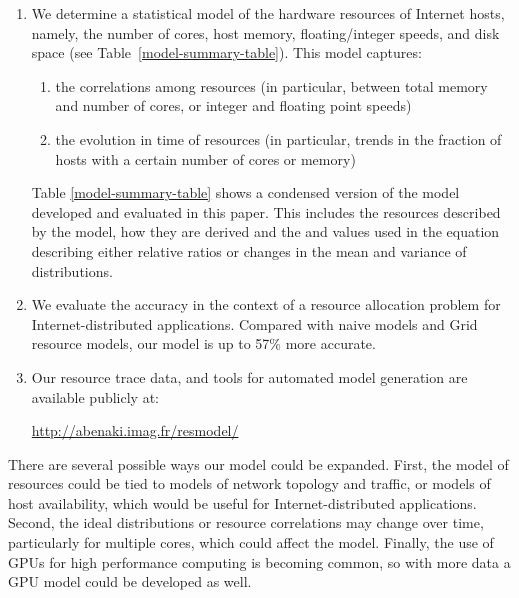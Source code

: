 \documentclass[conference]{IEEEtran}
\begin{document}
\begin{enumerate}
\item We determine a statistical model of the hardware
  resources of Internet hosts, namely, the number of cores,
  host memory, floating/integer speeds, and disk space (see
  Table~\ref{model-summary-table}).  This model captures:
 
  \begin{enumerate}
  \item the correlations among resources (in particular,
    between total memory and number of cores, or integer and
    floating point speeds)
  \item the evolution in time of resources (in particular,
    trends in the fraction of hosts with a certain number of
    cores or memory)
  \end{enumerate}
  
  Table \ref{model-summary-table} shows a condensed version
  of the model developed and evaluated in this paper.  This
  includes the resources described by the model, how they
  are derived and the  and  values used in the
  equation  describing either relative
  ratios or changes in the mean and variance of
  distributions.

\item We evaluate the accuracy in the
  context of a resource allocation problem for Internet-distributed applications.  Compared with naive models and
  Grid resource models, our model is up to 57\% more
  accurate.

\item Our resource trace data, and tools for automated model
  generation are available publicly at:
  
   \url{http://abenaki.imag.fr/resmodel/}
\end{enumerate}



There are several possible ways our model could be expanded.
First, the model of resources could be tied to models of
network topology and traffic, or models of host
availability, which would be useful for Internet-distributed
applications.  Second, the ideal distributions or resource correlations may
change over time, particularly for multiple cores, which could affect the model.
Finally, the use of GPUs for high performance computing is becoming common,
so with more data a GPU model could be developed as well.
\end{document}
